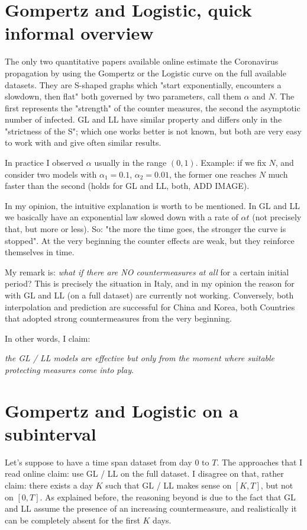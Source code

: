 \documentclass[6pt]{article}
\begin{document}
\section{Gompertz and Logistic, quick informal overview}
The only two quantitative papers available online estimate the Coronavirus propagation by using the Gompertz or the Logistic curve
on the full available datasets.
They are S-shaped graphs which "start exponentially, encounters a slowdown, then flat" both governed by two parameters, call
 them $\alpha$ and $N$. The first represents the "strength" of the counter measures, the second the asymptotic number of infected.
GL and LL have similar property and differs only in the "strictness of the S"; which one works better is not known, but both are
very easy to work with and give often similar results.

In practice I observed $\alpha$ usually in the range $(0, 1)$. Example: if we fix $N$, and consider two models with $\alpha_1 = 0.1$,
$\alpha_2 = 0.01$, the former one reaches $N$ much faster than the second (holds for GL and LL, both, ADD IMAGE).

In my opinion, the intuitive explanation is worth to be mentioned.
In GL and LL we basically have an exponential law slowed down with a rate of $\alpha t$ (not precisely that, but more or less).
So: "the more the time goes, the stronger the curve is stopped".
At the very beginning the counter effects are weak, but they reinforce themselves in time.

My remark is: \emph{what if there are NO countermeasures at all} for a certain initial period?
This is precisely the situation in Italy, and in my opinion the reason for with GL and LL (on a full dataset) are currently not working.
Conversely, both interpolation and prediction are successful for China and Korea, both Countries that 
adopted strong countermeasures from the very beginning.

In other words, I claim:

\emph{the GL / LL models are effective but only from the moment where suitable protecting measures come into play}.

\section{Gompertz and Logistic on a subinterval}
Let's suppose to have a time span dataset from day $0$ to $T$. The approaches that I read online claim: use GL / LL on the full dataset.
I disagree on that, rather claim: there exists a day $K$ such that GL / LL makes sense on $[K, T]$, but not on $[0, T]$.
As explained before, the reasoning beyond is due to the fact that GL and LL assume the presence of an increasing countermeasure,
and realistically it can be completely absent for the first $K$ days.
\end{document}
